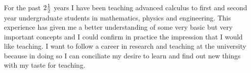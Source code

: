 For the past $2{1\over 2}$ years I have been teaching advanced
calculus to first and second year undergraduate students in
mathematics, physics and  engineering. This experience has given me  a better
understanding of some very basic but very important concepts and I
could confirm in practice the impression that I would
like teaching. I want to follow a career in research and teaching
at the university because in doing so I can conciliate my desire to learn and
find out new things with my taste for teaching.

